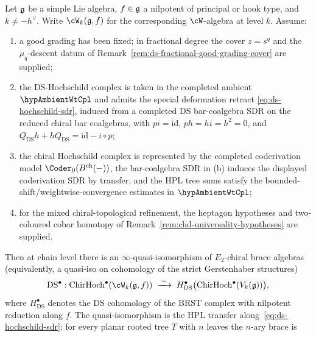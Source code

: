 \begin{theorem}%
\label{thm:chd-ds-hochschild}%
%
Let $\mathfrak{g}$ be a simple Lie algebra, $f \in \mathfrak{g}$ a nilpotent of principal
or hook type, and $k \ne -h^{\vee}$. Write $\cW_k(\fg, f)$ for the
corresponding $\cW$-algebra at level $k$. Assume:
\begin{enumerate}[label=\textup{(\alph*)}]
\item a good grading has been fixed; in fractional degree the cover
 \(z=s^q\) and the \(\mu_q\)-descent datum of
 Remark~\ref{rem:ds-fractional-good-grading-cover} are supplied;
\item the DS-Hochschild complex is taken in the completed ambient
 \(\hypAmbientWtCpl\) and admits the special deformation retract
 \eqref{eq:ds-hochschild-sdr}, induced from a completed
 DS bar-coalgebra SDR on the reduced chiral bar coalgebras, with
 \(p i=\mathrm{id}\), \(ph=hi=h^2=0\), and
 \(Q_{\mathrm{DS}}h+hQ_{\mathrm{DS}}=\mathrm{id}-i\circ p\);
\item the chiral Hochschild complex is represented by the completed
 coderivation model
 \(\Coder_0(B^{\mathrm{ch}}(-))\), the bar-coalgebra SDR in
 \textup{(b)} induces the displayed coderivation SDR by transfer, and
 the HPL tree sums satisfy the bounded-shift/weightwise-convergence
 estimates in \(\hypAmbientWtCpl\);
\item for the mixed chiral-topological refinement, the heptagon
 hypotheses and two-coloured cobar homotopy of
 Remark~\ref{rem:chd-universality-hypotheses} are supplied.
\end{enumerate}
Then at chain level there is
an $\infty$-quasi-isomorphism of $E_2$-chiral brace algebras (equivalently,
a quasi-iso on cohomology of the strict Gerstenhaber structures)
\begin{equation}\label{eq:chd-ds-hh}
 \mathrm{DS}^\bullet:
 \ChirHoch^\bullet(\cW_k(\fg, f)) \;\xrightarrow{\;\sim\;}\;
 H^\bullet_{\mathrm{DS}}\bigl(\ChirHoch^\bullet(V_k(\fg))\bigr),
\end{equation}
where $H^\bullet_{\mathrm{DS}}$ denotes the DS cohomology of the
BRST complex with nilpotent reduction along $f$. The quasi-isomorphism
is the HPL transfer along~\eqref{eq:ds-hochschild-sdr}: for every
planar rooted tree \(T\) with \(n\) leaves the \(n\)-ary brace is
\begin{equation}

\end{equation}
\end{theorem}
